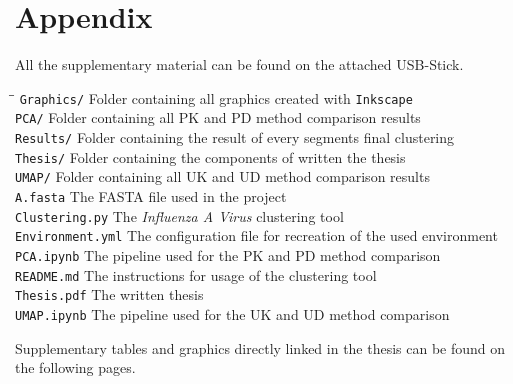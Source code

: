\chapter{Appendix}  \label{chap:Appendix}

All the supplementary material can be found on the attached USB-Stick.

\begin{tabbing}
    \hspace{4cm}\=\=\kill
    \texttt{Graphics/} \> Folder containing all graphics created with \texttt{Inkscape}\\
    \texttt{PCA/} \> Folder containing all PK and PD method comparison results\\
    \texttt{Results/} \> Folder containing the result of every segments final clustering\\
    \texttt{Thesis/} \> Folder containing the components of written the thesis\\
    \texttt{UMAP/} \> Folder containing all UK and UD method comparison results\\
    \texttt{A.fasta} \> The FASTA file used in the project\\
    \texttt{Clustering.py} \> The \textit{Influenza A Virus} clustering tool\\
    \texttt{Environment.yml} \> The configuration file for recreation of the used environment\\
    \texttt{PCA.ipynb} \> The pipeline used for the PK and PD method comparison\\
    \texttt{README.md} \> The instructions for usage of the clustering tool\\
    \texttt{Thesis.pdf} \> The written thesis\\
    \texttt{UMAP.ipynb} \> The pipeline used for the UK and UD method comparison\\
\end{tabbing}

Supplementary tables and graphics directly linked in the thesis can be found on the following pages.

